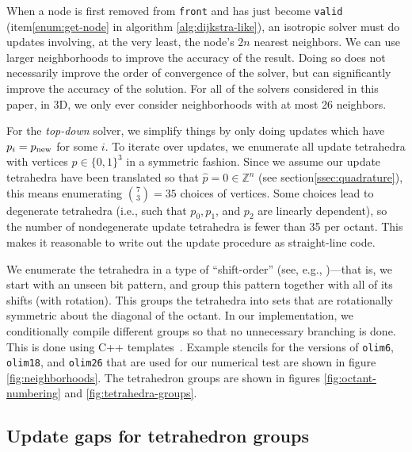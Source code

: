 \documentclass[smallcondensed]{svjour3}
\begin{document}
When a node is first removed from \texttt{front} and has just become
\texttt{valid} (item\@ \ref{enum:get-node} in algorithm\@
\ref{alg:dijkstra-like}), an isotropic solver must do updates
involving, at the very least, the node's $2n$ nearest neighbors. We
can use larger neighborhoods to improve the accuracy of the
result. Doing so does not necessarily improve the order of convergence
of the solver, but can significantly improve the accuracy of the
solution. For all of the solvers considered in this paper, in 3D, we
only ever consider neighborhoods with at most 26 neighbors.

For the \emph{top-down} solver, we simplify things by only doing
updates which have $p_i = p_{\operatorname{new}}$ for some $i$. To iterate over
updates, we enumerate all update tetrahedra with vertices
$p \in \{0, 1\}^3$ in a symmetric fashion. Since we assume our update
tetrahedra have been translated so that $\hat{p} = 0 \in \mathbb{Z}^n$
(see section\@ \ref{ssec:quadrature}), this means enumerating
${7 \choose 3} = 35$ choices of vertices. Some choices lead to
degenerate tetrahedra (i.e., such that $p_0, p_1$, and $p_2$ are
linearly dependent), so the number of nondegenerate update tetrahedra
is fewer than 35 per octant. This makes it reasonable to write out the
update procedure as straight-line code.

We enumerate the tetrahedra in a type of ``shift-order'' (see, e.g.,
\cite{arndt2010matters})---that is, we start with an unseen bit
pattern, and group this pattern together with all of its shifts (with
rotation). This groups the tetrahedra into sets that are rotationally
symmetric about the diagonal of the octant. In our implementation, we
conditionally compile different groups so that no unnecessary
branching is done. This is done using C++
templates~\cite{stroustrup2013c++}. Example stencils for the versions
of \texttt{olim6}, \texttt{olim18}, and \texttt{olim26} that are used
for our numerical test are shown in figure
\ref{fig:neighborhoods}. The tetrahedron groups are shown in figures
\ref{fig:octant-numbering} and \ref{fig:tetrahedra-groups}.

\subsection{Update gaps for tetrahedron
  groups}\label{ssec:update-gaps}
\end{document}
